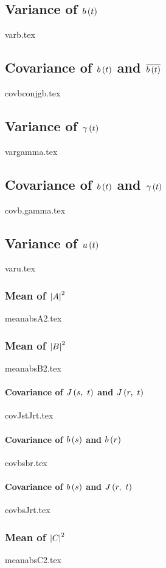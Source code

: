 \documentclass[letterpaper, 12pt]{article}
\begin{document}
		\subsection{Variance of $b \left( t \right)$} \label{app:var_b}
			{varb.tex}
		\subsection{Covariance of $b \left( t \right)$ and $\overline{b \left( t \right)}$}
			{covbconjgb.tex}
		\subsection{Variance of $\gamma \left( t \right)$}
			{vargamma.tex}
		\subsection{Covariance of $b \left( t \right)$ and $\gamma \left( t \right)$}
			{covb.gamma.tex} %
		\subsection{Variance of $u \left( t \right)$}
			{varu.tex}
			\subsubsection{Mean of $\abs{A}^2$} \label{app:mean_absA2}
				{meanabsA2.tex}
			\subsubsection{Mean of $\abs{B}^2$} \label{app:mean_absB2}
				{meanabsB2.tex}
				\paragraph{Covariance of $J \left( s,\ t \right)$ and $J \left( r,\ t \right)$}
					{covJstJrt.tex}
				\paragraph{Covariance of $b \left( s \right)$ and $b \left( r \right)$} \label{app:cov_bs_br}
					{covbsbr.tex}
				\paragraph{Covariance of $b \left( s \right)$ and $J \left( r,\ t \right)$}
					{covbsJrt.tex}
			\subsubsection{Mean of $\abs{C}^2$} \label{app:mean_absC2}
				{meanabsC2.tex}
\end{document}

